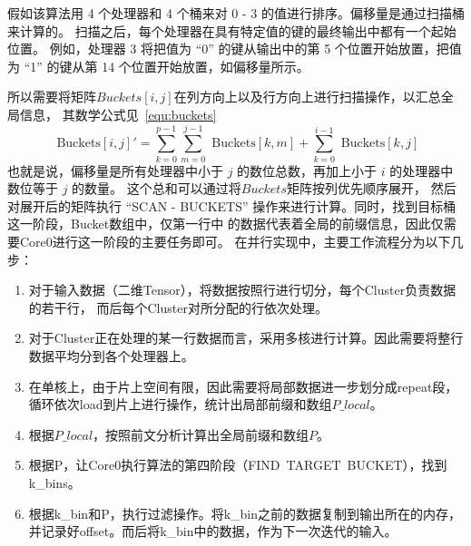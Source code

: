 假如该算法用 4 个处理器和 4 个桶来对 0 - 3 的值进行排序。偏移量是通过扫描桶来计算的。
扫描之后，每个处理器在具有特定值的键的最终输出中都有一个起始位置。
例如，处理器 3 将把值为 “0” 的键从输出中的第 5 个位置开始放置，把值为 “1” 的键从第 14 个位置开始放置，如偏移量所示。

所以需要将矩阵\(Buckets[i, j]\)在列方向上以及行方向上进行扫描操作，以汇总全局信息，
其数学公式见~\ref{equ:buckets}
\begin{equation}
    \text{ Buckets}[i, j]' = \sum_{k = 0}^{p - 1} \sum_{m = 0}^{j - 1} \text{ Buckets}[k, m] + \sum_{k = 0}^{i - 1} \text{ Buckets}[k, j]
    \label{equ:buckets}
\end{equation}
也就是说，偏移量是所有处理器中小于 $j$ 的数位总数，再加上小于 $i$ 的处理器中数位等于 $j$ 的数量。
这个总和可以通过将$Buckets$矩阵按列优先顺序展开，
然后对展开后的矩阵执行 “SCAN - BUCKETS” 操作来进行计算。同时，找到目标桶这一阶段，Bucket数组中，仅第一行中
的数据代表着全局的前缀信息，因此仅需要Core0进行这一阶段的主要任务即可。
在并行实现中，主要工作流程分为以下几步：
\begin{enumerate}
    \item 对于输入数据（二维Tensor），将数据按照行进行切分，每个Cluster负责数据的若干行，
    而后每个Cluster对所分配的行依次处理。
    \item 对于Cluster正在处理的某一行数据而言，采用多核进行计算。因此需要将整行数据平均分到各个处理器上。
    \item 在单核上，由于片上空间有限，因此需要将局部数据进一步划分成repeat段，循环依次load到片上进行操作，统计出局部前缀和数组\(P\_local\)。
    \item 根据\(P\_local\)，按照前文分析计算出全局前缀和数组\(P\)。
    \item 根据P，让Core0执行算法的第四阶段（FIND\ TARGET\ BUCKET），找到k\_bins。
    \item 根据k\_bin和P，执行过滤操作。将k\_bin之前的数据复制到输出所在的内存，并记录好offset。而后将k\_bin中的数据，作为下一次迭代的输入。
\end{enumerate}

